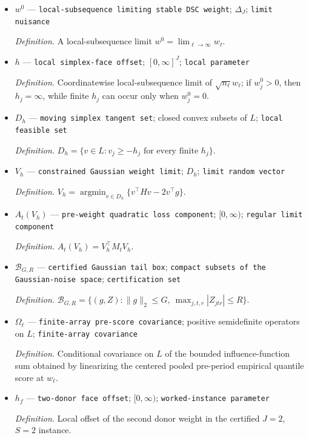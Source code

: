 \documentclass{article}
\begin{document}
\begin{itemize}
  \item \(w^0\) --- \texttt{local-\allowbreak{}subsequence limiting stable DSC weight}; \(\Delta_J\); \texttt{limit nuisance}
  \par\smallskip\noindent\emph{Definition.} A local-subsequence limit \(w^0=\lim_{\ell\to\infty}w_\ell\).
  \item \(h\) --- \texttt{local simplex-\allowbreak{}face offset}; \([0,\infty]^J\); \texttt{local parameter}
  \par\smallskip\noindent\emph{Definition.} Coordinatewise local-subsequence limit of \(\sqrt{n_\ell}w_\ell\); if \(w_j^0>0\), then \(h_j=\infty\), while finite \(h_j\) can occur only when \(w_j^0=0\).
  \item \(D_h\) --- \texttt{moving simplex tangent set}; closed convex subsets of \(L\); \texttt{local feasible set}
  \par\smallskip\noindent\emph{Definition.} \(D_h=\{v\in L:v_j\geq-h_j\text{ for every finite }h_j\}\).
  \item \(V_h\) --- \texttt{constrained Gaussian weight limit}; \(D_h\); \texttt{limit random vector}
  \par\smallskip\noindent\emph{Definition.} \(V_h=\operatorname*{argmin}_{v\in D_h}\{v^\top Hv-2v^\top g\}\).
  \item \(A_t(V_h)\) --- \texttt{pre-\allowbreak{}weight quadratic loss component}; \([0,\infty)\); \texttt{regular limit component}
  \par\smallskip\noindent\emph{Definition.} \(A_t(V_h)=V_h^\top M_tV_h\).
  \item \(\mathcal B_{G,R}\) --- \texttt{certified Gaussian tail box}; \texttt{compact subsets of the Gaussian-\allowbreak{}noise space}; \texttt{certification set}
  \par\smallskip\noindent\emph{Definition.} \(\mathcal B_{G,R}=\{(g,Z):\|g\|_2\leq G,\ \max_{j,t,r}|Z_{jtr}|\leq R\}\).
  \item \(\Omega_\ell\) --- \texttt{finite-\allowbreak{}array pre-\allowbreak{}score covariance}; positive semidefinite operators on \(L\); \texttt{finite-\allowbreak{}array covariance}
  \par\smallskip\noindent\emph{Definition.} Conditional covariance on \(L\) of the bounded influence-function sum obtained by linearizing the centered pooled pre-period empirical quantile score at \(w_\ell\).
  \item \(h_f\) --- \texttt{two-\allowbreak{}donor face offset}; \([0,\infty)\); \texttt{worked-\allowbreak{}instance parameter}
  \par\smallskip\noindent\emph{Definition.} Local offset of the second donor weight in the certified \(J=2\), \(S=2\) instance.

\end{itemize}
\end{document}
